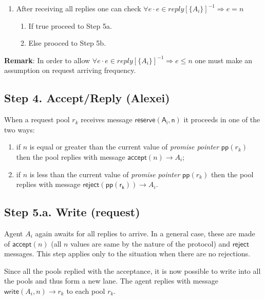 \documentclass[11pt,parskip=half]{scrartcl} %
\begin{document}
	\begin{enumerate}
		\item After receiving all replies one can check  $\mathsf \forall e \cdot e \in reply[\{A_i\}]^{-1} \Rightarrow e = n$
		\begin{enumerate}
			\item If true proceed to Step 5a.
			\item Else prooced to Step 5b.
		\end{enumerate}
	\end{enumerate}
	
	\textbf{Remark}: In order to allow $\mathsf \forall e \cdot e \in reply[\{A_i\}]^{-1} \Rightarrow e \leq n$ one must make an assumption on request arriving frequency. 
	
	
	
	\subsection*{Step 4. Accept/Reply (Alexei)}
	
	When a request pool $r_k$ receives message $\mathsf{reserve(A_i, n)}$ it proceeds in one of the two ways:
	\begin{enumerate}
		\item if $n$ is equal or greater than the current value of \emph{promise pointer} $\mathsf{pp}(r_k)$ then the pool replies with message $\mathsf{accept}(n) \rightarrow A_i$;
		\item if $n$ is less than the current value of \emph{promise pointer} $\mathsf{pp}(r_k)$ then the pool replies with message $\mathsf{reject(\mathsf{pp}(r_k))} \rightarrow A_i$.
	\end{enumerate}
	
	
	
	\subsection*{Step 5.a. Write (request)}
	
	Agent $A_i$ again awaits for all replies to arrive. In a general case, these are made of  $\mathsf{accept}(n)$ (all $n$ values are same by the nature of the protocol) and  $\mathsf{reject}$ messages. This step applies only to the situation when there are no rejections.
	
	Since all the pools replied with the acceptance, it is now possible to write into all the pools and thus form a new lane. The agent replies with message $\mathsf{write}(A_i, n) \rightarrow r_k$ to each pool $r_k$.
	
\end{document}
